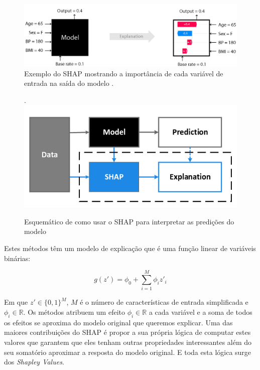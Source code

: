 \begin{figure}[H]
 \caption{Exemplo do SHAP mostrando a importância de cada variável de entrada na saída do modelo \cite{shap:doc}.}
 \label{fig:ex:shap}
 \centering
 \includegraphics[scale=0.2]{images/exemplo_shap_black.png}
\end{figure}

\begin{figure}[H]
 \caption{Esquemático de como usar o SHAP para interpretar as predições do modelo \cite{iee:artigo:shap}}.
 \label{fig:ex:shap2}
 \centering
 \includegraphics[scale=0.4]{images/over_shap.png}
\end{figure}

Estes métodos têm um modelo de explicação que é uma função linear de variáveis binárias:

\begin{equation}
    g(z') = \phi_{0} + \sum_{i=1}^{M} \phi_{i}z'_{i}
\end{equation}

Em que $z'\in \{0,1\}^M$, $M$ é o número de características de entrada simplificada e $\phi_i\in\mathbb{R}$. Os métodos atribuem um efeito $\phi_i\in\mathbb{R}$ a cada variável e a soma de todos os efeitos se aproxima do modelo original que queremos explicar. Uma das maiores contribuições do SHAP é propor a sua própria lógica de computar estes valores que garantem que eles tenham outras propriedades interessantes além do seu somatório aproximar a resposta do modelo original. E toda esta lógica surge dos \textit{Shapley Values}.


